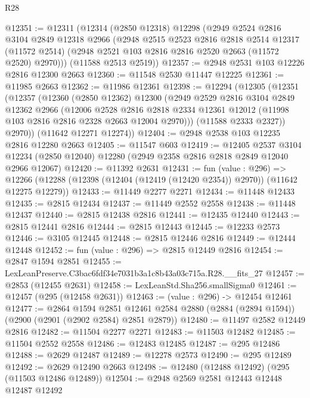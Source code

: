 \begin{lexlean}{R28}
\begin{coremodule}
@12351 := @12311
    (@12314
      (@2850 @12318)
      @12298
      (@2949
        @2524
        @2816
        @3104
        @2849
        @12318
        @2966
        (@2948
          @2515
          @2523
          @2816
          @2818
          @2514
          @12317
          (@11572 @2514)
          (@2948 @2521 @103 @2816 @2816 @2520 @2663 (@11572 @2520) @2970)))
      (@11588 @2513 @2519))
@12357 := @2948 @2531 @103 @12226 @2816 @12300 @2663
@12360 := @11548 @2530 @11447 @12225
@12361 := @11985 @2663
@12362 := @11986 @12361
@12398 := @12294
    (@12305
      (@12351
        (@12357
          (@12360
            (@2850 @12362)
            @12300
            (@2949
              @2529
              @2816
              @3104
              @2849
              @12362
              @2966
              (@12006
                @2528
                @2816
                @2818
                @2334
                @12361
                @12012
                (@11998 @103 @2816 @2816 @2328 @2663 @12004 @2970)))
            (@11588 @2333 @2327))
          @2970))
      (@11642 @12271 @12274))
@12404 := @2948 @2538 @103 @12235 @2816 @12280 @2663
@12405 := @11547 @603
@12419 := @12405
    @2537
    @3104
    @12234
    (@2850 @12040)
    @12280
    (@2949 @2358 @2816 @2818 @2849 @12040 @2966 @12067)
@12420 := @11392 @2631
@12431 := fun (value : @296) =>
  @12266 (@12288 (@12398 (@12404 (@12419 (@12420 @2354)) @2970)) (@11642 @12275 @12279))
@12433 := @11449 @2277 @2271
@12434 := @11448 @12433
@12435 := @2815 @12434
@12437 := @11449 @2552 @2558
@12438 := @11448 @12437
@12440 := @2815 @12438 @2816
@12441 := @12435 @12440
@12443 := @2815 @12441 @2816
@12444 := @2815 @12443
@12445 := @12233 @2573
@12446 := @3105 @12445
@12448 := @2815 @12446 @2816
@12449 := @12444 @12448
@12452 := fun (value : @296) => @2815 @12449 @2816
@12454 := @2847 @1594 @2851
@12455 := LexLeanPreserve.C3bac6fdf34e7031b3a1c8b43a03c715a.R28.__fits_27
@12457 := @2853 (@12455 @2631)
@12458 := LexLeanStd.Sha256.smallSigma0
@12461 := @12457 (@295 (@12458 @2631))
@12463 := (value : @296) -> @12454 @12461
@12477 := @2864
    @1594
    @2851
    @12461
    @2584
    @2880
    (@2884 (@2894 @1594))
    (@2900 (@2901 (@2902 @2584) @2851 @2879))
@12480 := @11497 @2582 @12449 @2816
@12482 := @11504 @2277 @2271
@12483 := @11503 @12482
@12485 := @11504 @2552 @2558
@12486 := @12483 @12485
@12487 := @295 @12486
@12488 := @2629 @12487
@12489 := @12278 @2573
@12490 := @295 @12489
@12492 := @2629 @12490 @2663
@12498 := @12480 (@12488 @12492) (@295 (@11503 @12486 @12489))
@12504 := @2948 @2569 @2581 @12443 @12448 @12487 @12492

\end{coremodule}
\end{lexlean}
